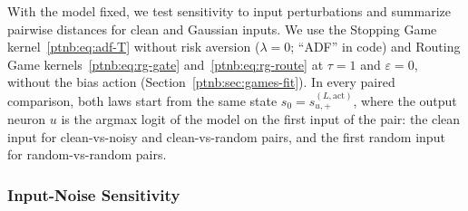 With the model fixed, we test sensitivity to input perturbations and summarize pairwise distances for clean and Gaussian inputs. We use the Stopping Game kernel~\eqref{ptnb:eq:adf-T} without risk aversion ($\lambda = 0$; ``ADF'' in code) and Routing Game kernels~\eqref{ptnb:eq:rg-gate} and~\eqref{ptnb:eq:rg-route} at $\tau = 1$ and $\varepsilon=0$, without the bias action (Section~\ref{ptnb:sec:games-fit}). In every paired comparison, both laws start from the same state $s_0=s^{(L,\mathrm{act})}_{u,+}$, where the output neuron $u$ is the argmax logit of the model on the first input of the pair: the clean input for clean-vs-noisy and clean-vs-random pairs, and the first random input for random-vs-random pairs.

\subsubsection{Input-Noise Sensitivity}\label{ptnb:sec:input-noise-hellinger}

